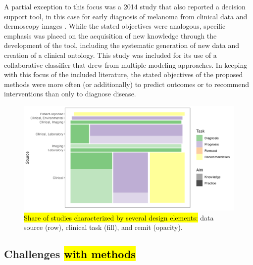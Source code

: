 \documentclass[sn-mathphys,Numbered,pdflatex]{sn-jnl}
\theoremstyle{remark}
\theoremstyle{definition}
\begin{document}
A partial exception to this focus was a 2014 study that also reported a
decision support tool, in this case for early diagnosis of melanoma from
clinical data and dermoscopy images \citep{Nicolas2014}. While the
stated objectives were analogous, specific emphasis was placed on the
acquisition of new knowledge through the development of the tool,
including the systematic generation of new data and creation of a
clinical ontology. This study was included for its use of a
collaborative classifier that drew from multiple modeling approaches. In
keeping with this focus of the included literature, the stated
objectives of the proposed methods were more often (or additionally) to
predict outcomes or to recommend interventions than only to diagnose
disease.

\begin{figure}

{\centering \includegraphics[width=1\linewidth]{Fig3} 

}

\caption{\hl{Share of studies characterized by several design elements:}
 data source (row),
 clinical task (fill), and
 remit (opacity).}\label{fig:properties}
\end{figure}

\subsection{\texorpdfstring{Challenges\hl{ with methods}}{Challenges}}\label{challenges}
\end{document}
